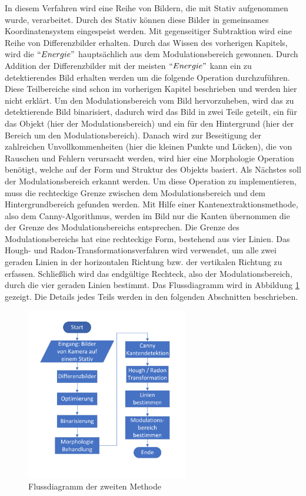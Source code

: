 In diesem Verfahren wird eine Reihe von Bildern, die mit Stativ aufgenommen wurde, verarbeitet. Durch des Stativ können diese Bilder in gemeinsames Koordinatensystem eingespeist werden. Mit gegenseitiger Subtraktion wird eine Reihe von Differenzbilder erhalten. Durch das Wissen des vorherigen Kapitels, wird die $``Energie"$ hauptsächlich aus dem Modulationsbereich gewonnen. Durch Addition der Differenzbilder mit der meisten $``Energie"$ kann ein zu detektierendes Bild erhalten werden um die folgende Operation durchzuführen. Diese Teilbereiche sind schon im vorherigen Kapitel beschrieben und werden hier nicht erklärt. Um den Modulationsbereich vom Bild hervorzuheben, wird das zu detektierende Bild binarisiert, dadurch wird das Bild in zwei Teile geteilt, ein für das Objekt (hier der Modulationsbereich) und ein für den Hintergrund (hier der Bereich um den Modulationsbereich). Danach wird zur Beseitigung der zahlreichen Unvollkommenheiten (hier die kleinen Punkte und Lücken), die von Rauschen und Fehlern verursacht werden, wird hier eine Morphologie Operation benötigt, welche auf der Form und Struktur des Objekts basiert. Als Nächstes soll der Modulationsbereich erkannt werden. Um diese Operation zu implementieren, muss die rechteckige Grenze zwischen dem Modulationsbereich und dem Hintergrundbereich gefunden werden. Mit Hilfe einer Kantenextraktionsmethode, also dem Canny-Algorithmus, werden im Bild nur die Kanten übernommen die der Grenze des Modulationsbereichs entsprechen. Die Grenze des Modulationsbereichs hat eine rechteckige Form, bestehend aus vier Linien. Das Hough- und Radon-Transformationsverfahren wird verwendet, um alle zwei geraden Linien in der horizontalen Richtung bzw. der vertikalen Richtung zu erfassen. Schließlich wird das endgültige Rechteck, also der Modulationsbereich, durch die vier geraden Linien bestimmt. Das Flussdiagramm wird in Abbildung \ref{fig:Flussdiagramm der zweite Methode} gezeigt. Die Details jedes Teils werden in den folgenden Abschnitten beschrieben.

\begin{figure}[H]
 \centering 
 \includegraphics[keepaspectratio,width=0.63\textwidth]{images/4_ZweiteErfahrung/Flussdiagrammsum.pdf}
 \caption{Flussdiagramm der zweiten Methode}
 \label{fig:Flussdiagramm der zweite Methode}
\end{figure}

